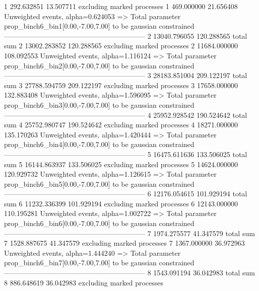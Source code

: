 1          292.632851      13.507711       excluding marked processes    
1          469.000000      21.656408       Unweighted events, alpha=0.624053
  => Total parameter prop_binch6_bin1[0.00,-7.00,7.00] to be gaussian constrained
------------------------------------------------------------
2          13040.796055    120.288565      total sum                     
2          13002.283852    120.288565      excluding marked processes    
2          11684.000000    108.092553      Unweighted events, alpha=1.116124
  => Total parameter prop_binch6_bin2[0.00,-7.00,7.00] to be gaussian constrained
------------------------------------------------------------
3          28183.851004    209.122197      total sum                     
3          27788.594759    209.122197      excluding marked processes    
3          17658.000000    132.883408      Unweighted events, alpha=1.596095
  => Total parameter prop_binch6_bin3[0.00,-7.00,7.00] to be gaussian constrained
------------------------------------------------------------
4          25952.928542    190.524642      total sum                     
4          25752.980747    190.524642      excluding marked processes    
4          18271.000000    135.170263      Unweighted events, alpha=1.420444
  => Total parameter prop_binch6_bin4[0.00,-7.00,7.00] to be gaussian constrained
------------------------------------------------------------
5          16475.611636    133.506025      total sum                     
5          16144.863937    133.506025      excluding marked processes    
5          14624.000000    120.929732      Unweighted events, alpha=1.126615
  => Total parameter prop_binch6_bin5[0.00,-7.00,7.00] to be gaussian constrained
------------------------------------------------------------
6          12176.054615    101.929194      total sum                     
6          11232.336399    101.929194      excluding marked processes    
6          12143.000000    110.195281      Unweighted events, alpha=1.002722
  => Total parameter prop_binch6_bin6[0.00,-7.00,7.00] to be gaussian constrained
------------------------------------------------------------
7          1974.275577     41.347579       total sum                     
7          1528.887675     41.347579       excluding marked processes    
7          1367.000000     36.972963       Unweighted events, alpha=1.444240
  => Total parameter prop_binch6_bin7[0.00,-7.00,7.00] to be gaussian constrained
------------------------------------------------------------
8          1543.091194     36.042983       total sum                     
8          886.648619      36.042983       excluding marked processes    
